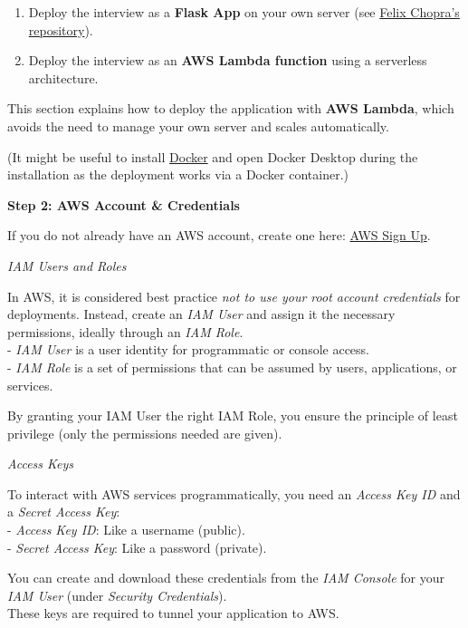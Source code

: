 \documentclass[
  letterpaper,
  DIV=11,
  numbers=noendperiod]{scrartcl}
\begin{document}
\begin{enumerate}
\def\labelenumi{\arabic{enumi}.}
\item
  Deploy the interview as a \textbf{Flask App} on your own server (see
  \href{https://github.com/fchop/interviews}{Felix Chopra's
  repository}).
\item
  Deploy the interview as an \textbf{AWS Lambda function} using a
  serverless architecture.
\end{enumerate}

This section explains how to deploy the application with \textbf{AWS
Lambda}, which avoids the need to manage your own server and scales
automatically.

(It might be useful to install
\href{https://docs.docker.com/engine/install/}{Docker} and open Docker
Desktop during the installation as the deployment works via a Docker
container.)

\textbf{Step 2: AWS Account \& Credentials}

If you do not already have an AWS account, create one here:
\href{https://signin.aws.amazon.com/signup?request_type=register}{AWS
Sign Up}.

\emph{IAM Users and Roles}

In AWS, it is considered best practice \emph{not to use your root
account credentials} for deployments. Instead, create an \emph{IAM User}
and assign it the necessary permissions, ideally through an \emph{IAM
Role}.\\
- \emph{IAM User} is a user identity for programmatic or console
access.\\
- \emph{IAM Role} is a set of permissions that can be assumed by users,
applications, or services.

By granting your IAM User the right IAM Role, you ensure the principle
of least privilege (only the permissions needed are given).

\emph{Access Keys}

To interact with AWS services programmatically, you need an \emph{Access
Key ID} and a \emph{Secret Access Key}:\\
- \emph{Access Key ID}: Like a username (public).\\
- \emph{Secret Access Key}: Like a password (private).

You can create and download these credentials from the \emph{IAM
Console} for your \emph{IAM User} (under \emph{Security Credentials}).\\
These keys are required to tunnel your application to AWS.
\end{document}

